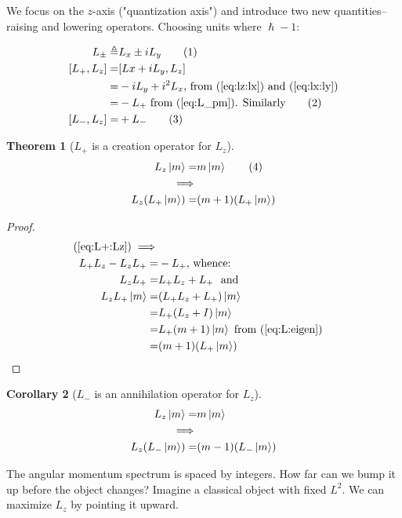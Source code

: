 \documentclass[]{article}
\newcommand\numberthis{\addtocounter{equation}{1}\tag{\theequation}}
\newtheorem{thm}{Theorem}
\newtheorem{cor}[thm]{Corollary}
\begin{document}
We focus on the $z$-axis ("quantization axis") and introduce two new quantities--raising and lowering operators. Choosing units where $\hslash-1$:

\begin{align*}
	L_\pm \triangleq& L_x \pm i L_y \numberthis \label{eq:L_pm} \\
	[L_+,L_z] =& [Lx+i L_y,L_z]\\
	=& -iL_y + i^2 L_x \text{, from (\ref{eq:lz:lx}) and (\ref{eq:lx:ly})}\\
	=& -L_+ \text{ from (\ref{eq:L_pm}). Similarly} \numberthis \label{eq:L+:Lz}\\
	[L_-,L_z] =& + L_- \numberthis \label{eq:L-:Lz}
\end{align*}

\begin{thm}[$L_+$ is a creation operator for $L_z$]\label{thm:angular:momentum:creation}
	\begin{align*}
		L_z \ket{m} =& m \ket{m} \numberthis \label{eq:L:eigen}\\
		\implies&\\
		L_z (L_+ \ket{m}) =& (m+1) (L_+ \ket{m})
	\end{align*}	
\end{thm}

\begin{proof}
	\begin{align*}
		(\ref{eq:L+:Lz})\implies\\
		L_+L_z-L_zL_+ =& -L_+ \text{, whence:}\\
		L_zL_+ =& L_+L_z + L_+\ \text{ and}\\
		L_z L_+ \ket{m} =& (L_+L_z + L_+)\ket{m}\\
		=& L_+ (L_z + I)\ket{m}\\
		=& L_+ (m + 1) \ket{m} \text{ from (\ref{eq:L:eigen})}\\
		=&  (m + 1) (L_+ \ket{m})
	\end{align*}
\end{proof}

\begin{cor}[$L_-$ is an annihilation  operator for $L_z$]
	\begin{align*}
	L_z \ket{m} =& m \ket{m} \\
	\implies&\\
	L_z (L_- \ket{m}) =& (m-1) (L_- \ket{m})
	\end{align*}	
\end{cor}

The angular momentum spectrum is spaced by integers. How far can we bump it up before the object changes? Imagine a classical object with fixed $L^2$. We can maximize $L_z$  by pointing it upward.
\end{document}

